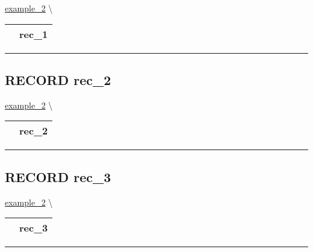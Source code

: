 \hypertarget{ecldoc:example_2.rec_1}{}
\hspace{0pt} \hyperlink{ecldoc:example_2}{example_2} \textbackslash 

{\renewcommand{\arraystretch}{1.5}
\begin{tabularx}{\textwidth}{|>{\raggedright\arraybackslash}l|X|}
\hline
\hspace{0pt}\mytexttt{\color{red} } & \textbf{rec\_1} \\
\hline
\end{tabularx}
}

\par


\rule{\linewidth}{0.5pt}
\subsection*{\textsf{\colorbox{headtoc}{\color{white} RECORD}
rec\_2}}

\hypertarget{ecldoc:example_2.rec_2}{}
\hspace{0pt} \hyperlink{ecldoc:example_2}{example_2} \textbackslash 

{\renewcommand{\arraystretch}{1.5}
\begin{tabularx}{\textwidth}{|>{\raggedright\arraybackslash}l|X|}
\hline
\hspace{0pt}\mytexttt{\color{red} } & \textbf{rec\_2} \\
\hline
\end{tabularx}
}

\par


\rule{\linewidth}{0.5pt}
\subsection*{\textsf{\colorbox{headtoc}{\color{white} RECORD}
rec\_3}}

\hypertarget{ecldoc:example_2.rec_3}{}
\hspace{0pt} \hyperlink{ecldoc:example_2}{example_2} \textbackslash 

{\renewcommand{\arraystretch}{1.5}
\begin{tabularx}{\textwidth}{|>{\raggedright\arraybackslash}l|X|}
\hline
\hspace{0pt}\mytexttt{\color{red} } & \textbf{rec\_3} \\
\hline
\end{tabularx}
}

\par


\rule{\linewidth}{0.5pt}
